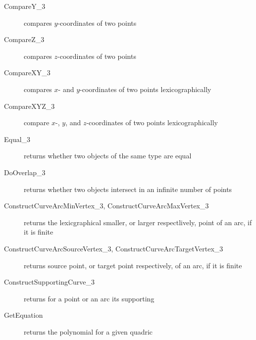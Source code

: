\begin{description}
\item[CompareY\_3] compares $y$-coordinates of two points
\item[CompareZ\_3] compares $z$-coordinates of two points
\item[CompareXY\_3] compares $x$- and $y$-coordinates of two points 
lexicographically
\item[CompareXYZ\_3] compare $x$-, $y$, and $z$-coordinates of two points
lexicographically
\item [Equal\_3] returns whether two objects of the same type are equal
\item [DoOverlap\_3] returns whether two objects intersect in an infinite 
number of points
\item [ConstructCurveArcMinVertex\_3, 
ConstructCurveArcMaxVertex\_3]
returns the lexicgraphical smaller, or larger respectlively, 
point of an arc, if it is finite
\item [ConstructCurveArcSourceVertex\_3, 
ConstructCurveArcTargetVertex\_3] 
returns source point, or target point respectively, of an arc, if it is finite
\item [ConstructSupportingCurve\_3] returns for a point or an arc its
supporting 
\item [GetEquation] returns the polynomial for a given quadric
\end{description}



